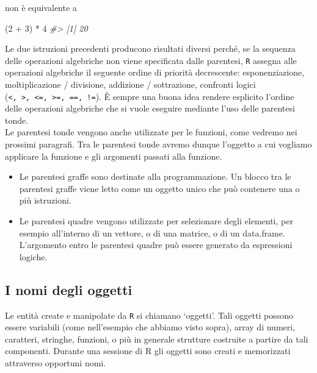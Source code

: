 \documentclass[
  11pt,
]{krantz}
\makeatletter
\newenvironment{Shaded}{\begin{snugshade}}{\end{snugshade}}
\newcommand{\CommentTok}[1]{\textcolor[rgb]{0.37,0.37,0.37}{\textit{#1}}}
\newcommand{\DecValTok}[1]{\textcolor[rgb]{0.06,0.06,0.06}{#1}}
\newcommand{\NormalTok}[1]{#1}
\newcommand{\SpecialCharTok}[1]{\textcolor[rgb]{0,0,0}{#1}}
\newenvironment{kframe}{%
\medskip{}
\setlength{\fboxsep}{.8em}
 \def\at@end@of@kframe{}%
 \ifinner\ifhmode%
  \def\at@end@of@kframe{\end{minipage}}%
  \begin{minipage}{\columnwidth}%
 \fi\fi%
 \def\FrameCommand##1{\hskip\@totalleftmargin \hskip-\fboxsep
 \colorbox{shadecolor}{##1}\hskip-\fboxsep
     \hskip-\linewidth \hskip-\@totalleftmargin \hskip\columnwidth}%
 \MakeFramed {\advance\hsize-\width
   \@totalleftmargin\z@ \linewidth\hsize
   \@setminipage}}%
 {\par\unskip\endMakeFramed%
 \at@end@of@kframe}
\renewenvironment{Shaded}{\begin{kframe}}{\end{kframe}}
\theoremstyle{definition}
\theoremstyle{definition}
\theoremstyle{definition}
\theoremstyle{definition}
\theoremstyle{remark}
\makeatother
\begin{document}
non è equivalente a

\begin{Shaded}
\begin{Highlighting}[]
\NormalTok{(}\DecValTok{2} \SpecialCharTok{+} \DecValTok{3}\NormalTok{) }\SpecialCharTok{*} \DecValTok{4}
\CommentTok{\#\textgreater{} [1] 20}
\end{Highlighting}
\end{Shaded}

Le due istruzioni precedenti producono risultati diversi perché, se la sequenza delle operazioni algebriche non viene specificata dalle parentesi, \texttt{R} assegna alle operazioni algebriche il seguente ordine di priorità decrescente: esponenziazione, moltiplicazione / divisione, addizione / sottrazione, confronti logici (\texttt{\textless{},\ \textgreater{},\ \textless{}=,\ \textgreater{}=,\ ==,\ !=}). È sempre una buona idea rendere esplicito l'ordine delle operazioni algebriche che si vuole eseguire mediante l'uso delle parentesi tonde.\\
Le parentesi tonde vengono anche utilizzate per le funzioni, come vedremo nei prossimi paragrafi. Tra le parentesi tonde avremo dunque l'oggetto a cui vogliamo applicare la funzione e gli argomenti passati alla funzione.

\begin{itemize}
\item
  Le parentesi graffe sono destinate alla programmazione. Un blocco tra le parentesi graffe viene letto come un oggetto unico che può contenere una o più istruzioni.
\item
  Le parentesi quadre vengono utilizzate per selezionare degli elementi, per esempio all'interno di un vettore, o di una matrice, o di un data.frame. L'argomento entro le parentesi quadre può essere generato da espressioni logiche.
\end{itemize}

\hypertarget{i-nomi-degli-oggetti}{%
\subsection{I nomi degli oggetti}\label{i-nomi-degli-oggetti}}

Le entità create e manipolate da \texttt{R} si chiamano `oggetti'. Tali oggetti possono essere variabili (come nell'esempio che abbiamo visto sopra), array di numeri, caratteri, stringhe, funzioni, o più in generale strutture costruite a partire da tali componenti. Durante una sessione di R gli oggetti sono creati e memorizzati attraverso opportuni nomi.
\end{document}
